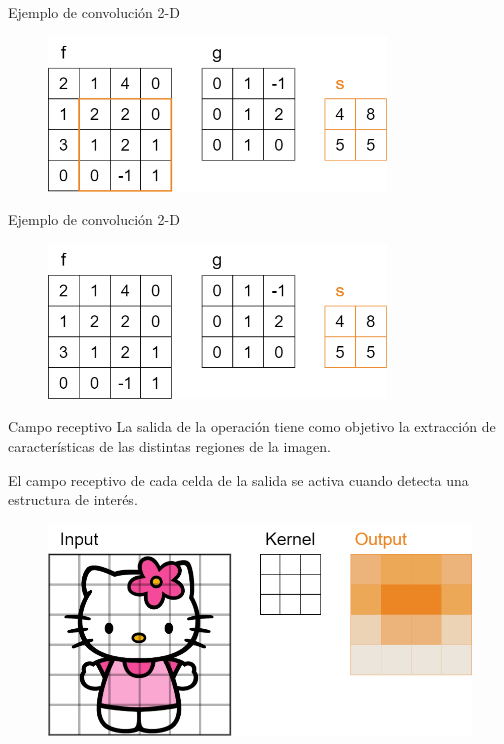 \begin{frame}{Ejemplo de convolución 2-D}
\begin{figure}
    \centering
    \includegraphics[width=0.8\textwidth]{Slides/figures/Tema 2/Convolucion2D_5.png}
\end{figure}
\end{frame}

\begin{frame}{Ejemplo de convolución 2-D}
\begin{figure}
    \centering
    \includegraphics[width=0.8\textwidth]{Slides/figures/Tema 2/Convolucion2D_Res.png}
\end{figure}
\end{frame}

\begin{frame}{Campo receptivo}
La salida de la \alert{operación} tiene como objetivo la \alert{extracción de características} de las distintas \alert{regiones de la imagen}.

El \alert{campo receptivo} de cada celda de la salida se \alert{activa} cuando detecta una \alert{estructura de interés}.

\begin{figure}
    \centering
    \includegraphics[width=\textwidth]{Slides/figures/Tema 3/ReceptiveActivation.png}
\end{figure}
\end{frame}

